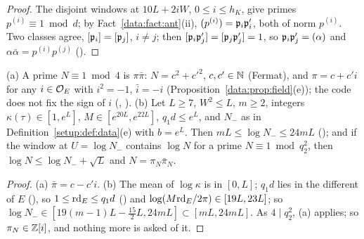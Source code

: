 \begin{proof}
The disjoint windows at $10L + 2iW$, $0 \le i \le h_K$, give primes
$p^{(i)} \equiv 1 \bmod d$; by Fact~\ref{data:fact:ant}(ii), $(p^{(i)}) = \mathfrak{p}_i\mathfrak{p}'_i$, both of norm
$p^{(i)}$. Two classes agree, $[\mathfrak{p}_i] = [\mathfrak{p}_j]$,
$i \ne j$; then $[\mathfrak{p}_i\mathfrak{p}'_j] = [\mathfrak{p}_j\mathfrak{p}'_j] = 1$, so $\mathfrak{p}_i\mathfrak{p}'_j = (\alpha)$ and
$\alpha\bar\alpha = p^{(i)}p^{(j)}$ ().
\end{proof}

\begin{lemma}
\label{data:lem:level}
(a) A prime $N \equiv 1 \bmod 4$ is $\pi\bar\pi$: $N = c^2 + c'^2$, $c, c' \in \mathbb{N}$ (Fermat), and
$\pi = c + c'i$ for any $i \in \mathcal{O}_E$ with $i^2 = -1$, $\bar i = -i$
(Proposition~\ref{data:prop:field}(e)); the code does not fix the sign of $i$
(,
). (b) Let $L \ge 7$, $W^2 \le L$,
$m \ge 2$, integers $\kappa(\tau) \in [1, e^L]$, $M \in [e^{20L}, e^{22L}]$, $q_1d \le e^L$, and $N_-$ as in
Definition~\ref{setup:def:data}(e) with $b = e^L$. Then $mL \le \log N_- \le 24mL$
(); and if the window at $U = \log N_-$ contains $\log N$
for a prime $N \equiv 1 \bmod q_2^2$, then $\log N \le \log N_- + \sqrt L$ and $N = \pi_N\bar\pi_N$.
\end{lemma}

\begin{proof}
(a) $\bar\pi = c - c'i$. (b) The mean of $\log\kappa$ is in $[0, L]$; $q_1d$ lies in the different
of $E$ (), so $1 \le \mathrm{rd}_E \le q_1d$
() and $\log(M\mathrm{rd}_E/2\pi) \in [19L, 23L]$; so
$\log N_- \in [19(m-1)L - \frac{15}2L, 24mL] \subset [mL, 24mL]$. As
$4 \mid q_2^2$, (a) applies; so $\pi_N \in \mathbb{Z}[i]$, and nothing more is asked of it.
\end{proof}


